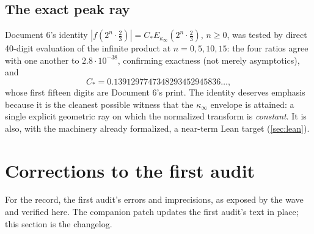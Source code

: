 \documentclass[11pt,oneside]{article}
\theoremstyle{definition}
\theoremstyle{remark}
\begin{document}
\subsection{The exact peak ray}
\label{ssec:peak-ray}

Document 6's identity
$|f(2^n\cdot\frac23)|=C_*E_{\kappa_\infty}(2^n\cdot\frac23)$, $n\ge0$,
was tested by direct 40-digit evaluation of the infinite product at
$n=0,5,10,15$: the four ratios agree with one another to
$2.8\cdot10^{-38}$, confirming exactness (not merely asymptotics), and
\[
 C_*=0.1391297747348293452945836\ldots,
\]
whose first fifteen digits are Document 6's print.  The identity
deserves emphasis because it is the cleanest possible witness that the
$\kappa_\infty$ envelope is attained: a single explicit geometric ray on
which the normalized transform is \emph{constant}.  It is also, with
the machinery already formalized, a near-term Lean target
(\cref{sec:lean}).

\section{Corrections to the first audit}
\label{sec:corrections}

For the record, the first audit's errors and imprecisions, as exposed
by the wave and verified here.  The companion patch updates the first
audit's text in place; this section is the changelog.
\end{document}
